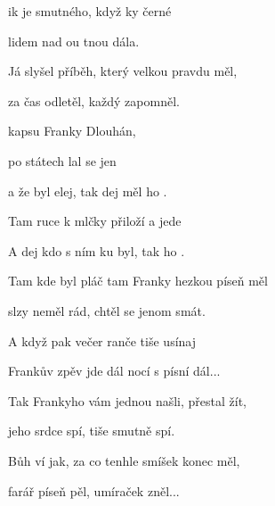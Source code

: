

\zs
{}ik je smutného,
když ky černé 

lidem nad ou tnou dála.

Já slyšel příběh, který velkou pravdu měl,

za čas odletěl, každý zapomněl.
\ks

\zr
{} kapsu  Franky Dlouhán,

po státech lal se jen 

a že byl elej, tak dej měl ho .

Tam ruce k  mlčky přiloží
a 
jede 

A dej kdo s ním
ku byl, tak ho  .
\kr

\zs
Tam kde byl pláč tam Franky hezkou píseň měl

slzy neměl rád, chtěl se jenom smát.

A když pak večer ranče tiše usínaj

Frankův zpěv jde dál nocí s písní dál...
\ks

\zr \kr

\zs
Tak Frankyho vám jednou našli, přestal žít,

jeho srdce spí, tiše smutně spí.

Bůh ví jak, za co tenhle smíšek konec měl,

farář píseň pěl, umíraček zněl...
\ks
\kp









